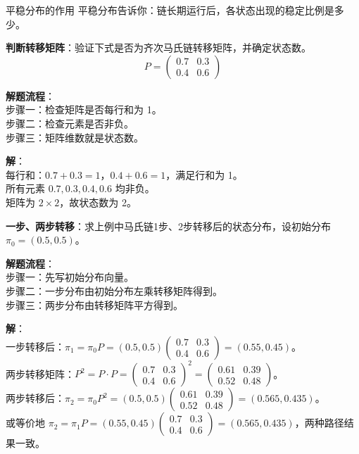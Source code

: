 \begin{keypoint}{平稳分布的作用}
平稳分布告诉你：链长期运行后，各状态出现的稳定比例是多少。
\end{keypoint}

\begin{example}
\label{ex:ch3-transition-matrix-check}
\textbf{判断转移矩阵}：验证下式是否为齐次马氏链转移矩阵，并确定状态数。
\[
P = \begin{pmatrix}
0.7 & 0.3 \\
0.4 & 0.6
\end{pmatrix}
\]

\noindent \textbf{解题流程}：\\[2pt]
步骤一：检查矩阵是否每行和为 1。\\
步骤二：检查元素是否非负。\\
步骤三：矩阵维数就是状态数。

\noindent \textbf{解}：\\[2pt]
每行和：$0.7+0.3=1$，$0.4+0.6=1$，满足行和为 1。\\
所有元素 $0.7,0.3,0.4,0.6$ 均非负。\\
矩阵为 $2\times2$，故状态数为 2。
\end{example}

\begin{example}
\label{ex:ch3-one-two-step-transition}
\textbf{一步、两步转移}：求上例中马氏链1步、2步转移后的状态分布，设初始分布 $\pi_0=(0.5,0.5)$。

\noindent \textbf{解题流程}：\\[2pt]
步骤一：先写初始分布向量。\\
步骤二：一步分布由初始分布左乘转移矩阵得到。\\
步骤三：两步分布由转移矩阵平方得到。

\noindent \textbf{解}：\\[2pt]
一步转移后：$\pi_1=\pi_0 P =(0.5,0.5)\begin{pmatrix}0.7&0.3\\0.4&0.6\end{pmatrix}=(0.55,0.45)$。\\[4pt]
两步转移矩阵：$P^2=P\cdot P=\begin{pmatrix}0.7&0.3\\0.4&0.6\end{pmatrix}^2=\begin{pmatrix}0.61&0.39\\0.52&0.48\end{pmatrix}$。\\
两步转移后：$\pi_2=\pi_0 P^2=(0.5,0.5)\begin{pmatrix}0.61&0.39\\0.52&0.48\end{pmatrix}=(0.565,0.435)$。\\[2pt]
或等价地 $\pi_2=\pi_1 P=(0.55,0.45)\begin{pmatrix}0.7&0.3\\0.4&0.6\end{pmatrix}=(0.565,0.435)$，两种路径结果一致。
\end{example}

